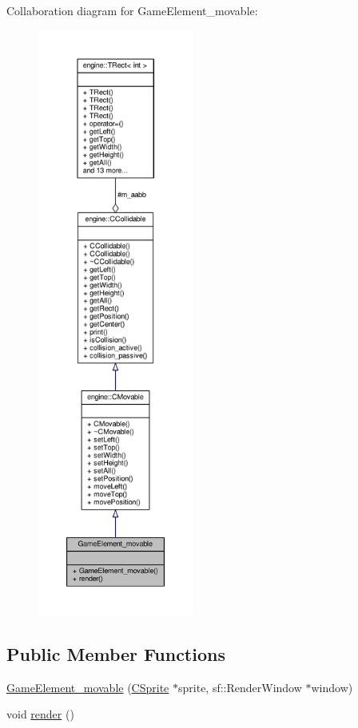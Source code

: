 Collaboration diagram for Game\-Element\-\_\-movable\-:
\nopagebreak
\begin{figure}[H]
\begin{center}
\leavevmode
\includegraphics[height=550pt]{classGameElement__movable__coll__graph}
\end{center}
\end{figure}
\subsection*{Public Member Functions}
\begin{DoxyCompactItemize}
\item 
\hyperlink{classGameElement__movable_ac9009600530046f90e75ebcea411d907}{Game\-Element\-\_\-movable} (\hyperlink{classCSprite}{C\-Sprite} $\ast$sprite, sf\-::\-Render\-Window $\ast$window)
\item 
void \hyperlink{classGameElement__movable_a503e47a89c65d149529a3af6dc1064a1}{render} ()
\end{DoxyCompactItemize}
